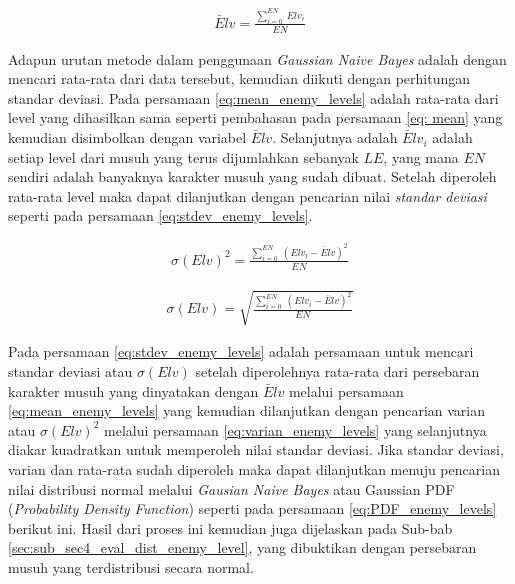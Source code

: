 \begin{equation}\label{eq:mean_enemy_levels}
\begin{split}
\bar{E}lv = \frac{\sum_{i = 0}^{EN}\ Elv_{i}}{EN}
\end{split}
\end{equation}

Adapun urutan metode dalam penggunaan \textit{Gaussian Naive Bayes} adalah dengan mencari rata-rata dari data tersebut, kemudian diikuti dengan perhitungan standar deviasi. Pada persamaan \ref{eq:mean_enemy_levels} adalah rata-rata dari level yang dihasilkan sama seperti pembahasan pada persamaan \ref{eq: mean} yang kemudian disimbolkan dengan variabel $\bar{E}lv$. Selanjutnya adalah $\bar{E}lv_{i}$ adalah setiap level dari musuh yang terus dijumlahkan sebanyak $LE$, yang mana $EN$ sendiri adalah banyaknya karakter musuh yang sudah dibuat. Setelah diperoleh rata-rata level maka dapat dilanjutkan dengan pencarian nilai \textit{standar deviasi} seperti pada persamaan \ref{eq:stdev_enemy_levels}.
\vspace{1ex}

\begin{equation}\label{eq:varian_enemy_levels}
\begin{split}
\sigma(Elv)^2 = \frac{\sum_{i = 0}^{EN}\ (Elv_{i} - \bar{E}lv)^{2}}{EN}
\end{split}
\end{equation}

\begin{equation}\label{eq:stdev_enemy_levels}
\begin{split}
\sigma(Elv) = \sqrt{\frac{\sum_{i = 0}^{EN}\ (Elv_{i} - \bar{E}lv)^{2}}{EN}}
\end{split}
\end{equation}

Pada persamaan \ref{eq:stdev_enemy_levels} adalah persamaan untuk mencari standar deviasi atau $\sigma(Elv)$ setelah diperolehnya rata-rata dari persebaran karakter musuh yang dinyatakan dengan $\bar{E}lv$ melalui persamaan \ref{eq:mean_enemy_levels} yang kemudian dilanjutkan dengan pencarian varian atau $\sigma(Elv)^2$ melalui persamaan \ref{eq:varian_enemy_levels} yang selanjutnya diakar kuadratkan untuk memperoleh nilai standar deviasi. Jika standar deviasi, varian dan rata-rata sudah diperoleh maka dapat dilanjutkan menuju pencarian nilai distribusi normal melalui \textit{Gausian Naive Bayes} atau Gaussian PDF (\textit{Probability Density Function}) seperti pada persamaan \ref{eq:PDF_enemy_levels} berikut ini. Hasil dari proses ini kemudian juga dijelaskan pada Sub-bab \ref{sec:sub_sec4_eval_dist_enemy_level}, yang dibuktikan dengan persebaran musuh yang terdistribusi secara normal.
\vspace{1ex}

